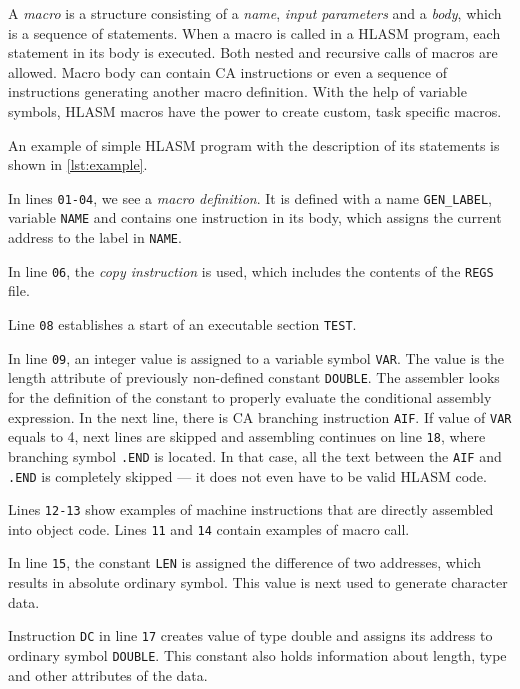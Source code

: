 A \emph{macro} is a structure consisting of a \emph{name}, \emph{input parameters} and a \emph{body}, which is a sequence of statements. When a macro is called in a HLASM program, each statement in its body is executed. Both nested and recursive calls of macros are allowed. Macro body can contain CA instructions or even a sequence of instructions generating another macro definition. With the help of variable symbols, HLASM macros have the power to create custom, task specific macros.

\vspace{5mm}

An example of simple HLASM program with the description of its statements is shown in \cref{lst:example}.

In lines \verb|01-04|, we see a \emph{macro definition}. It is defined with a name \verb|GEN_LABEL|, variable \verb|NAME| and contains one instruction in its body, which assigns the current address to the label in \verb|NAME|.

In line \verb|06|, the \emph{copy instruction} is used, which includes the contents of the \verb|REGS| file.

Line \verb|08| establishes a start of an executable section \verb|TEST|. 

In line \verb|09|, an integer value is assigned to a variable symbol \verb|VAR|. The value is the length attribute of previously non-defined constant \verb|DOUBLE|. The assembler looks for the definition of the constant to properly evaluate the conditional assembly expression. In the next line, there is CA branching instruction \verb|AIF|. If value of \verb|VAR| equals to 4, next lines are skipped and assembling continues on line \verb|18|, where branching symbol \verb|.END| is located. In that case, all the text between the \verb|AIF| and \verb|.END| is completely skipped --- it does not even have to be valid HLASM code.

Lines \verb|12-13| show examples of machine instructions that are directly assembled into object code. Lines \verb|11| and \verb|14| contain examples of macro call.

In line \verb|15|, the constant \verb|LEN| is assigned the difference of two addresses, which results in absolute ordinary symbol. This value is next used to generate character data.

Instruction \verb|DC| in line \verb|17| creates value of type double and assigns its address to ordinary symbol \verb|DOUBLE|. This constant also holds information about length, type and other attributes of the data.  

